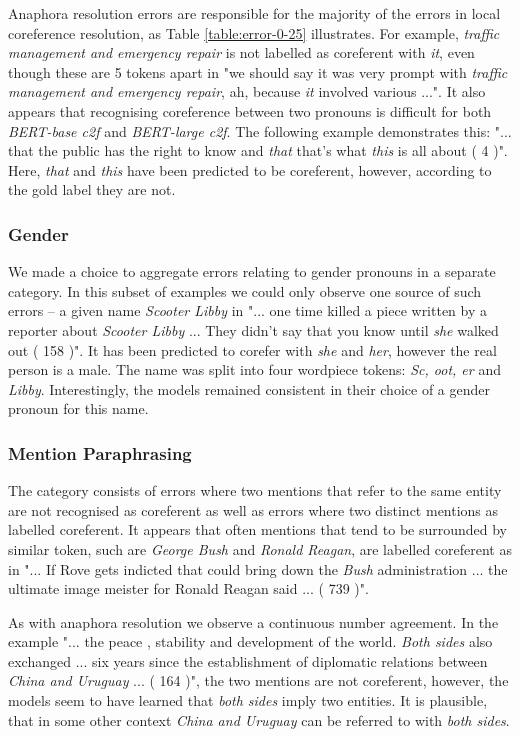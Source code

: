 \documentclass[11pt]{article}
\begin{document}
Anaphora resolution errors are responsible for the majority of the errors in local coreference resolution, as Table \ref{table:error-0-25} illustrates. For example, \textit{traffic management and emergency repair} is not labelled as coreferent with \textit{it}, even though these are 5 tokens apart in "we should say it was very prompt with \textit{traffic management and emergency repair}, ah, because \textit{it} involved various ...". It also appears that recognising coreference between two pronouns is difficult for both \textit{BERT-base c2f} and \textit{BERT-large c2f}. The following example demonstrates this: "... that the public has the right to know and \textit{that} that's what \textit{this} is all about ( 4 )". Here, \textit{that} and \textit{this} have been predicted to be coreferent, however, according to the gold label they are not.

\subsubsection{Gender}
We made a choice to aggregate errors relating to gender pronouns in a separate category. In this subset of examples we could only observe one source of such errors -- a given name \textit{Scooter Libby} in "... one time killed a piece written by a reporter about \textit{Scooter Libby} ... They didn't say that you know until \textit{she} walked out ( 158 )". It has been predicted to corefer with \textit{she} and \textit{her}, however the real person is a male. The name was split into four wordpiece tokens: \textit{Sc, oot, er} and \textit{Libby}. Interestingly, the models remained consistent in their choice of a gender pronoun for this name. 


\subsubsection{Mention Paraphrasing} The category consists of errors where two mentions that refer to the same entity are not recognised as coreferent as well as errors where two distinct mentions as labelled coreferent. It appears that often mentions that tend to be surrounded by similar token, such are \textit{George Bush} and \textit{Ronald Reagan}, are labelled coreferent as in "... If Rove gets indicted that could bring down the \textit{Bush} administration ... the ultimate image meister for Ronald Reagan said ... ( 739 )". 

As with anaphora resolution we observe a continuous number agreement. In the example "... the peace , stability and development of the world. \textit{Both sides} also exchanged ... six years since the establishment of diplomatic relations between \textit{China and Uruguay} ... ( 164 )", the two mentions are not coreferent, however, the models seem to have learned that \textit{both sides} imply two entities. It is plausible, that in some other context \textit{China and Uruguay} can be referred to with \textit{both sides}.
\end{document}
